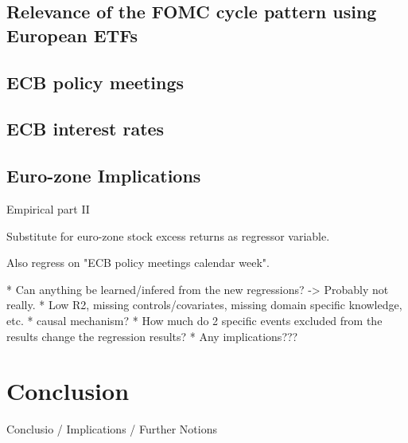 \section{Relevance of the FOMC cycle pattern using European ETFs}

\section{ECB policy meetings}

\section{ECB interest rates}

\section{Euro-zone Implications}

Empirical part II

Substitute for euro-zone stock excess returns as regressor variable.

Also regress on "ECB policy meetings calendar week". 

* Can anything be learned/infered from the new regressions? -> Probably not really.
* Low R2, missing controls/covariates, missing domain specific knowledge, etc.
* causal mechanism?
* How much do 2 specific events excluded from the results change the regression results?
* Any implications???


\chapter{Conclusion}

Conclusio / Implications / Further Notions



